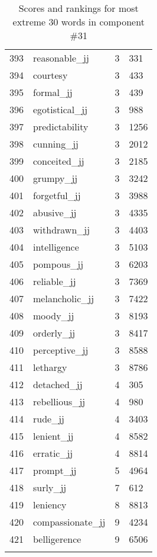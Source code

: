 \begin{longtable}[!htbp]{| rlr@{.}l |}
    393 & reasonable\_jj & 3 & 331 \\
    394 & courtesy & 3 & 433 \\
    395 & formal\_jj & 3 & 439 \\
    396 & egotistical\_jj & 3 & 988 \\
    397 & predictability & 3 & 1256 \\
    398 & cunning\_jj & 3 & 2012 \\
    399 & conceited\_jj & 3 & 2185 \\
    400 & grumpy\_jj & 3 & 3242 \\
    401 & forgetful\_jj & 3 & 3988 \\
    402 & abusive\_jj & 3 & 4335 \\
    403 & withdrawn\_jj & 3 & 4403 \\
    404 & intelligence & 3 & 5103 \\
    405 & pompous\_jj & 3 & 6203 \\
    406 & reliable\_jj & 3 & 7369 \\
    407 & melancholic\_jj & 3 & 7422 \\
    408 & moody\_jj & 3 & 8193 \\
    409 & orderly\_jj & 3 & 8417 \\
    410 & perceptive\_jj & 3 & 8588 \\
    411 & lethargy & 3 & 8786 \\
    412 & detached\_jj & 4 & 305 \\
    413 & rebellious\_jj & 4 & 980 \\
    414 & rude\_jj & 4 & 3403 \\
    415 & lenient\_jj & 4 & 8582 \\
    416 & erratic\_jj & 4 & 8814 \\
    417 & prompt\_jj & 5 & 4964 \\
    418 & surly\_jj & 7 & 612 \\
    419 & leniency & 8 & 8813 \\
    420 & compassionate\_jj & 9 & 4234 \\
    421 & belligerence & 9 & 6506 \\
    \hline
    \caption{Scores and rankings for most extreme 30 words in component \#31} \\
\end{longtable}
